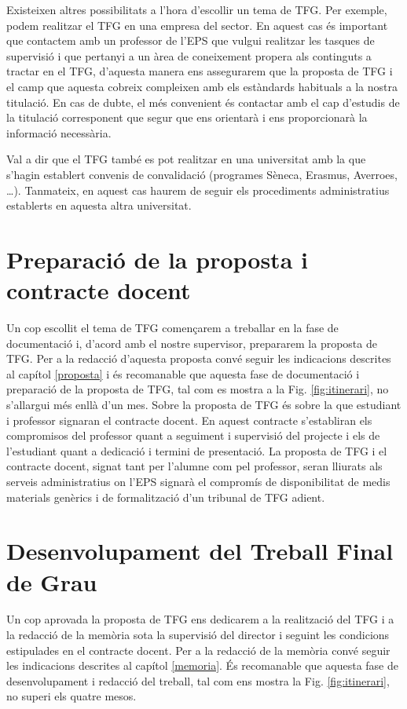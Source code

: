 Existeixen altres possibilitats a l'hora d'escollir un tema de \ac{TFG}. Per exemple, podem realitzar el \ac{TFG} en una empresa del sector. En aquest cas és important que contactem amb un professor de l'\ac{EPS} que vulgui realitzar les tasques de supervisió i que pertanyi a un àrea de coneixement propera als continguts a tractar en el \ac{TFG}, d'aquesta manera ens assegurarem que la proposta de \ac{TFG} i el camp que aquesta cobreix compleixen amb els estàndards habituals a la nostra titulació. En cas de dubte, el més convenient és contactar amb el cap d'estudis de la titulació corresponent que segur que ens orientarà i ens proporcionarà la informació necessària.

Val a dir que el \ac{TFG} també es pot realitzar en una universitat amb la que s'hagin establert convenis de convalidació (programes Sèneca, Erasmus, Averroes, \ldots). Tanmateix, en aquest cas haurem de seguir els procediments administratius establerts en aquesta altra universitat.

\section{Preparació de la proposta i contracte docent}

Un cop escollit el tema de \ac{TFG} començarem a treballar en la fase de documentació i, d'acord amb el nostre supervisor, prepararem la proposta de \ac{TFG}. Per a la redacció d'aquesta proposta convé seguir les indicacions descrites al capítol \ref{proposta} i és recomanable que aquesta fase de documentació i preparació de la proposta de \ac{TFG}, tal com es mostra a la Fig. \ref{fig:itinerari}, no s'allargui més enllà d'un mes. Sobre la proposta de \ac{TFG} és sobre la que estudiant i professor signaran el contracte docent. En aquest contracte s'establiran els compromisos del professor quant a seguiment i supervisió del projecte i els de l'estudiant quant a dedicació i termini de presentació. La proposta de \ac{TFG} i el contracte docent, signat tant per l'alumne com pel professor, seran lliurats als serveis administratius on l'\ac{EPS} signarà el compromís de disponibilitat de medis materials genèrics i de formalització d'un tribunal de \ac{TFG} adient.

\section{Desenvolupament del Treball Final de Grau}

Un cop aprovada la proposta de \ac{TFG} ens dedicarem a la realització del \ac{TFG} i a la redacció de la memòria sota la supervisió del director i seguint les condicions estipulades en el contracte docent. Per a la redacció de la memòria convé seguir les indicacions descrites al capítol \ref{memoria}. És recomanable que aquesta fase de desenvolupament i redacció del treball, tal com ens mostra la Fig. \ref{fig:itinerari}, no superi els quatre mesos.

